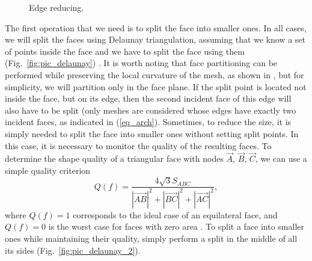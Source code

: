 \documentclass[
11pt,%
tightenlines,%
twoside,%
onecolumn,%
nofloats,%
nobibnotes,%
nofootinbib,%
superscriptaddress,%
noshowpacs,%
centertags]%
{revtex4-2}
\begin{document}
\begin{figure}[h]
\begin{minipage}[h]{0.28\textwidth}
    \caption{Edge reducing.}\label{fig:pic_reduce_edge}
  \end{minipage}
\end{figure}

The first operation that we need is to split the face into smaller ones.
In all cases, we will split the faces using Delaunay triangulation, assuming that we know a set of points inside the face and we have to split the face using them (Fig.~\ref{fig:pic_delaunay}) \cite{Rivara}.
It is worth noting that face partitioning can be performed while preserving the local curvature of the mesh, as shown in \cite{Rakotoarivelo}, but for simplicity, we will partition only in the face plane.
If the split point is located not inside the face, but on its edge, then the second incident face of this edge will also have to be split (only meshes are considered whose edges have exactly two incident faces, as indicated in (\ref{eq_arch}).
Sometimes, to reduce the size, it is simply needed to split the face into smaller ones without setting split points.
In this case, it is necessary to monitor the quality of the resulting faces.
To determine the shape quality of a triangular face with nodes
$\vec{A}$, $\vec{B}$, $\vec{C}$, we can use a simple quality
criterion
\begin{equation}
Q(f) = \frac{4\sqrt{3} S_{ABC}}{|\vec{AB}|^2 + |\vec{BC}|^2 +
|\vec{AC}|^2},
\end{equation}
where $Q(f) = 1$ corresponds to the ideal case of an equilateral
face, and $Q(f) = 0$ is the worst case for faces with zero area
\cite{Borouchaki}.
To split a face into smaller ones while maintaining their quality, simply perform a split in the middle of all its sides (Fig.~\ref{fig:pic_delaunay_2}).
\end{document}
